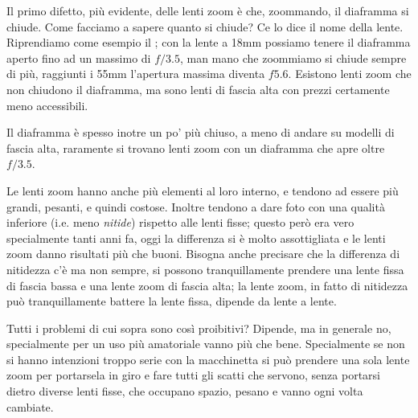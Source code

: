 Il primo difetto, più evidente, delle lenti zoom è che, zoommando, il diaframma si chiude. Come facciamo a sapere quanto si chiude? Ce lo dice il nome della lente.\newline
Riprendiamo come esempio il ; con la lente a 18mm possiamo tenere il diaframma aperto fino ad un massimo di $f/3.5$, man mano che zoommiamo si chiude sempre di più, raggiunti i 55mm l'apertura massima diventa $f5.6$. Esistono lenti zoom che non chiudono il diaframma, ma sono lenti di fascia alta con prezzi certamente meno accessibili.

Il diaframma è spesso inotre un po' più chiuso, a meno di andare su modelli di fascia alta, raramente si trovano lenti zoom con un diaframma che apre oltre $f/3.5$.

Le lenti zoom hanno anche più elementi al loro interno, e tendono ad essere più grandi, pesanti, e quindi costose.
Inoltre tendono a dare foto con una qualità inferiore (i.e. meno \textit{nitide}) rispetto alle lenti fisse; questo però era vero specialmente tanti anni fa, oggi la differenza si è molto assottigliata e le lenti zoom danno risultati più che buoni.
Bisogna anche precisare che la differenza di nitidezza c'è ma non sempre, si possono tranquillamente prendere una lente fissa di fascia bassa e una lente zoom di fascia alta; la lente zoom, in fatto di nitidezza può tranquillamente battere la lente fissa, dipende da lente a lente.

Tutti i problemi di cui sopra sono così proibitivi? Dipende, ma in generale no, specialmente per un uso più amatoriale vanno più che bene. Specialmente se non si hanno intenzioni troppo serie con la macchinetta si può prendere una sola lente zoom per portarsela in giro e fare tutti gli scatti che servono, senza portarsi dietro diverse lenti fisse, che occupano spazio, pesano e vanno ogni volta cambiate.

%


